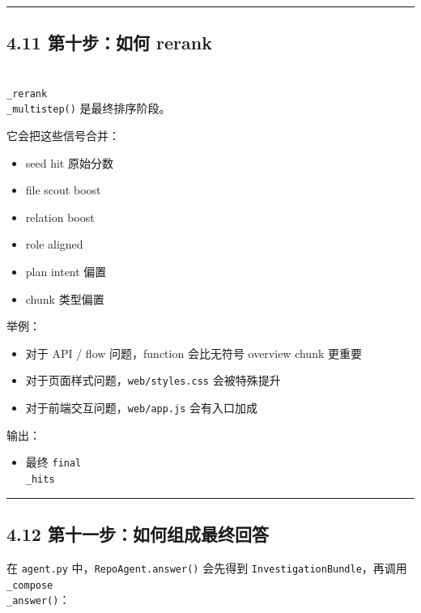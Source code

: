 \documentclass[UTF8,12pt,openany]{ctexbook}
\begin{document}
\hrule

\subsection{4.11 第十步：如何 rerank}

\texttt{\\_rerank\\_multistep()} 是最终排序阶段。\par

它会把这些信号合并：\par

\begin{itemize}
\item seed hit 原始分数
\item file scout boost
\item relation boost
\item role aligned
\item plan intent 偏置
\item chunk 类型偏置
\end{itemize}

举例：\par

\begin{itemize}
\item 对于 API / flow 问题，function 会比无符号 overview chunk 更重要
\item 对于页面样式问题，\texttt{web/styles.css} 会被特殊提升
\item 对于前端交互问题，\texttt{web/app.js} 会有入口加成
\end{itemize}

输出：\par

\begin{itemize}
\item 最终 \texttt{final\\_hits}
\end{itemize}

\hrule

\subsection{4.12 第十一步：如何组成最终回答}

在 \texttt{agent.py} 中，\texttt{RepoAgent.answer()} 会先得到 \texttt{InvestigationBundle}，再调用 \texttt{\\_compose\\_answer()}：\par
\end{document}
